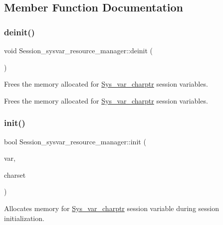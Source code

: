 \subsection{Member Function Documentation}
\mbox{\label{classSession__sysvar__resource__manager_a099e7961a4d1c193fac564efc0e3ecd4}} 
\subsubsection{\texorpdfstring{deinit()}{deinit()}}
{\footnotesize\ttfamily void Session\+\_\+sysvar\+\_\+resource\+\_\+manager\+::deinit (\begin{DoxyParamCaption}\item[{void}]{ }\end{DoxyParamCaption})}



Frees the memory allocated for \mbox{\hyperlink{classSys__var__charptr}{Sys\+\_\+var\+\_\+charptr}} session variables. 

Frees the memory allocated for \mbox{\hyperlink{classSys__var__charptr}{Sys\+\_\+var\+\_\+charptr}} session variables. \mbox{\label{classSession__sysvar__resource__manager_ab8b24f45b62c94db75fc79ef34b5b309}} 
\subsubsection{\texorpdfstring{init()}{init()}}
{\footnotesize\ttfamily bool Session\+\_\+sysvar\+\_\+resource\+\_\+manager\+::init (\begin{DoxyParamCaption}\item[{char $\ast$$\ast$}]{var,  }\item[{const C\+H\+A\+R\+S\+E\+T\+\_\+\+I\+N\+FO $\ast$}]{charset }\end{DoxyParamCaption})}

Allocates memory for \mbox{\hyperlink{classSys__var__charptr}{Sys\+\_\+var\+\_\+charptr}} session variable during session initialization.

